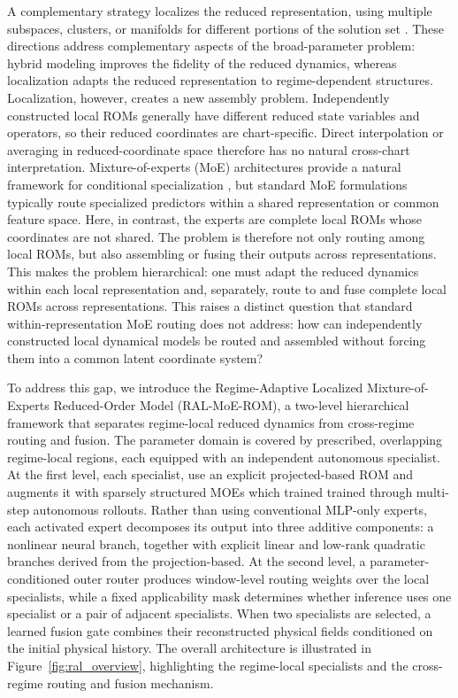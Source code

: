 A complementary strategy localizes the reduced representation, using multiple subspaces, clusters, or manifolds for different portions of the solution set \citep{kaiser2014,li2021cluster,diaz2024}. These directions address complementary aspects of the broad-parameter problem: hybrid modeling improves the fidelity of the reduced dynamics, whereas localization adapts the reduced representation to regime-dependent structures. Localization, however, creates a new assembly problem.  Independently constructed local ROMs generally have different reduced state variables and  operators, so their reduced coordinates are chart-specific. Direct interpolation or averaging in reduced-coordinate space therefore has no natural cross-chart interpretation. Mixture-of-experts (MoE) architectures provide a natural framework for conditional specialization \citep{jacobs1991,jordan1994,shazeer2017,fedus2022}, but standard MoE formulations typically route specialized predictors within a shared representation or common feature space. Here, in contrast, the experts are complete local ROMs whose coordinates are not shared. The problem is therefore not only routing among local ROMs, but also assembling or fusing their outputs across representations. This makes the problem hierarchical: one must adapt the reduced dynamics within each local representation and, separately, route to and fuse complete local ROMs across representations. This raises a distinct question that standard within-representation MoE routing does not address: how can independently constructed local dynamical models be routed and assembled without forcing them into a common latent coordinate system?


To address this gap, we introduce the Regime-Adaptive Localized Mixture-of-Experts Reduced-Order Model (RAL-MoE-ROM), a two-level hierarchical framework that separates regime-local reduced dynamics from cross-regime routing and fusion. The parameter domain is covered by prescribed, overlapping regime-local regions, each equipped with an independent  autonomous specialist. At the first level, each specialist, use an explicit projected-based ROM  and augments it with sparsely  structured MOEs which trained trained through  multi-step autonomous rollouts. Rather than using conventional MLP-only experts, each activated expert decomposes its output into three additive components: a nonlinear neural branch, together with explicit linear and low-rank quadratic branches derived from the projection-based. At the second level, a parameter-conditioned outer router produces window-level routing weights over the local specialists, while a fixed applicability mask determines whether inference uses one specialist or a pair of adjacent specialists. When two specialists are selected, a learned fusion gate combines their reconstructed physical fields conditioned on the initial physical history. The overall architecture is illustrated in Figure~\ref{fig:ral_overview}, highlighting the regime-local specialists and the cross-regime routing and fusion mechanism.





